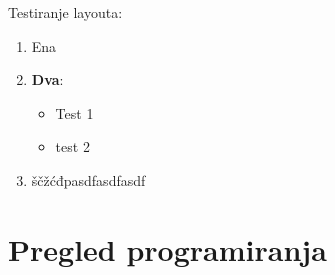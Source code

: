 
Testiranje layouta:

\begin{enumerate}
\item Ena
\item \textbf{Dva}:
  \begin{itemize}[style]
  \item Test 1
  \item test 2
  \end{itemize}
\item ščžćđpasdfasdfasdf
\end{enumerate}

\chapter{Pregled programiranja}
\label{chap:Pregled_programiranja}





